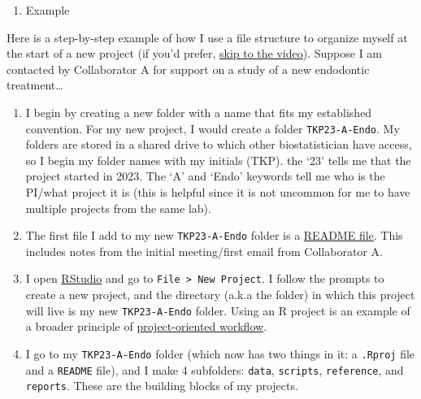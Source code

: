 \documentclass[
]{book}
\providecommand{\tightlist}{%
  \setlength{\itemsep}{0pt}\setlength{\parskip}{0pt}}
\begin{document}
\begin{enumerate}
\def\labelenumi{\arabic{enumi}.}
\setcounter{enumi}{3}
\tightlist
\item
  Example
\end{enumerate}

Here is a step-by-step example of how I use a file structure to organize myself at the start of a new project (if you'd prefer, \protect\hyperlink{folder-video}{skip to the video}). Suppose I am contacted by Collaborator A for support on a study of a new endodontic treatment\ldots{}

\begin{enumerate}
\def\labelenumi{\arabic{enumi}.}
\item
  I begin by creating a new folder with a name that fits my established convention. For my new project, I would create a folder \texttt{TKP23-A-Endo}. My folders are stored in a shared drive to which other biostatistician have access, so I begin my folder names with my initials (TKP). the `23' tells me that the project started in 2023. The `A' and `Endo' keywords tell me who is the PI/what project it is (this is helpful since it is not uncommon for me to have multiple projects from the same lab).
\item
  The first file I add to my new \texttt{TKP23-A-Endo} folder is a \protect\hyperlink{readme}{README file}. This includes notes from the initial meeting/first email from Collaborator A.
\item
  I open \href{https://posit.co/download/rstudio-desktop/}{RStudio} and go to \texttt{File\ \textgreater{}\ New\ Project}. I follow the prompts to create a new project, and the directory (a.k.a the folder) in which this project will live is my new \texttt{TKP23-A-Endo} folder. Using an R project is an example of a broader principle of \href{https://www.tidyverse.org/blog/2017/12/workflow-vs-script/}{project-oriented workflow}.
\item
  I go to my \texttt{TKP23-A-Endo} folder (which now has two things in it: a \texttt{.Rproj} file and a \texttt{README} file), and I make 4 subfolders: \texttt{data}, \texttt{scripts}, \texttt{reference}, and \texttt{reports}. These are the building blocks of my projects.
\end{enumerate}
\end{document}
